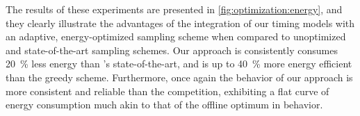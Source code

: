 The results of these experiments are presented in \cref{fig:optimization:energy}, and they clearly illustrate the advantages of the integration of our timing models with an adaptive, energy-optimized sampling scheme when compared to unoptimized and state-of-the-art sampling schemes.
Our approach is consistently consumes \SI{20}{\percent} less energy than \textcite{wang2019towards}'s state-of-the-art, and is up to \SI{40}{\percent} more energy efficient than the greedy scheme.
Furthermore, once again the behavior of our approach is more consistent and reliable than the competition, exhibiting a flat curve of energy consumption much akin to that of the offline optimum in behavior.

